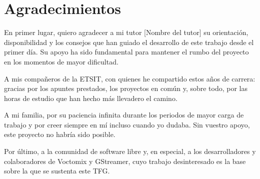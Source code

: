 \newpage
\thispagestyle{fancy}

\chapter*{Agradecimientos}

En primer lugar, quiero agradecer a mi tutor [Nombre del tutor] su orientación,
disponibilidad y los consejos que han guiado el desarrollo de este trabajo desde el
primer día. Su apoyo ha sido fundamental para mantener el rumbo del proyecto en los
momentos de mayor dificultad.

A mis compañeros de la ETSIT, con quienes he compartido estos años de carrera: gracias
por los apuntes prestados, los proyectos en común y, sobre todo, por las horas de
estudio que han hecho más llevadero el camino.

A mi familia, por su paciencia infinita durante los periodos de mayor carga de trabajo
y por creer siempre en mí incluso cuando yo dudaba. Sin vuestro apoyo, este proyecto no
habría sido posible.

Por último, a la comunidad de software libre y, en especial, a los desarrolladores y
colaboradores de Voctomix y GStreamer, cuyo trabajo desinteresado es la base sobre la
que se sustenta este TFG.

\newpage

